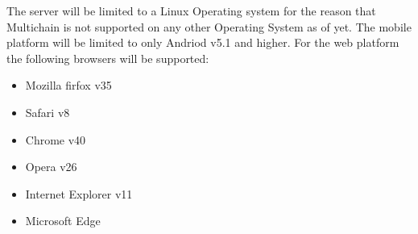 The server will be limited to a Linux Operating system for the reason that Multichain is not supported on any other Operating System as of yet.  The mobile platform will be limited to only Andriod v5.1 and higher. For the web platform the following browsers will be supported:
	\begin{itemize}	
		\item Mozilla firfox v35
		\item Safari v8
		\item Chrome v40
		\item Opera v26
		\item Internet Explorer v11 
		\item Microsoft Edge 
	\end{itemize}